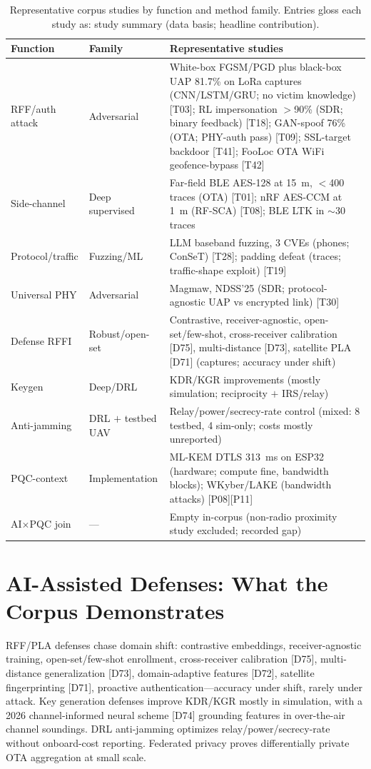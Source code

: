 \begin{table}[tbp]
\centering
\footnotesize
\setlength{\tabcolsep}{3pt}
\caption{Representative corpus studies by function and method family. Entries gloss each study as: study summary (data basis; headline contribution).}
\label{tab:representative}
\begin{tabular}{@{}>{\raggedright\arraybackslash}p{2.4cm} >{\raggedright\arraybackslash}p{2.4cm} >{\raggedright\arraybackslash}p{9.2cm}@{}}
\toprule
Function & Family & Representative studies \\
\midrule
RFF/auth attack & Adversarial & White-box FGSM/PGD plus black-box UAP 81.7\% on LoRa captures (CNN/LSTM/GRU; no victim knowledge) [T03]; RL impersonation $>$90\% (SDR; binary feedback) [T18]; GAN-spoof 76\% (OTA; PHY-auth pass) [T09]; SSL-target backdoor [T41]; FooLoc OTA WiFi geofence-bypass [T42] \\
Side-channel & Deep supervised & Far-field BLE AES-128 at 15~m, $<$400 traces (OTA) [T01]; nRF AES-CCM at 1~m (RF-SCA) [T08]; BLE LTK in $\sim$30 traces \\
Protocol/traffic & Fuzzing/ML & LLM baseband fuzzing, 3 CVEs (phones; ConSeT) [T28]; padding defeat (traces; traffic-shape exploit) [T19] \\
Universal PHY & Adversarial & Magmaw, NDSS'25 (SDR; protocol-agnostic UAP vs encrypted link) [T30] \\
Defense RFFI & Robust/open-set & Contrastive, receiver-agnostic, open-set/few-shot, cross-receiver calibration [D75], multi-distance [D73], satellite PLA [D71] (captures; accuracy under shift) \\
Keygen & Deep/DRL & KDR/KGR improvements (mostly simulation; reciprocity $+$ IRS/relay) \\
Anti-jamming & DRL $+$ testbed UAV & Relay/power/secrecy-rate control (mixed: 8 testbed, 4 sim-only; costs mostly unreported) \\
PQC-context & Implementation & ML-KEM DTLS 313~ms on ESP32 (hardware; compute fine, bandwidth blocks); WKyber/LAKE (bandwidth attacks) [P08][P11] \\
AI$\times$PQC join & --- & Empty in-corpus (non-radio proximity study excluded; recorded gap) \\
\bottomrule
\end{tabular}
\end{table}

\section{AI-Assisted Defenses: What the Corpus Demonstrates}
\label{sec:defense}
RFF/PLA defenses chase domain shift: contrastive embeddings, receiver-agnostic training, open-set/few-shot enrollment, cross-receiver calibration [D75], multi-distance generalization [D73], domain-adaptive features [D72], satellite fingerprinting [D71], proactive authentication---accuracy under shift, rarely under attack. Key generation defenses improve KDR/KGR mostly in simulation, with a 2026 channel-informed neural scheme [D74] grounding features in over-the-air channel soundings. DRL anti-jamming optimizes relay/power/secrecy-rate without onboard-cost reporting. Federated privacy proves differentially private OTA aggregation at small scale.

